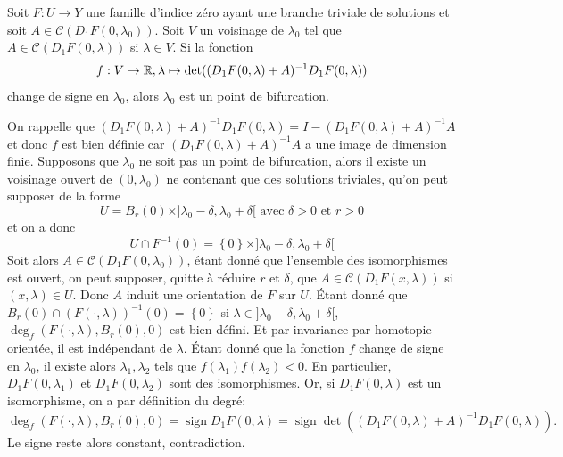 \documentclass[memoire.tex]{subfiles}
\begin{document}
\begin{theobox}{}{}
    Soit $F:U\rightarrow Y$ une famille d'indice zéro ayant une branche triviale de solutions et soit $A\in\mathcal{C}(D_1F(0,\lambda_0)) $. Soit $V$ un voisinage de $\lambda_0$ tel que  $A\in \mathcal{C}(D_1F(0,\lambda))$ si $\lambda\in V$. Si la fonction 
    \begin{equation*}
        f: V\rightarrow\mathbb{R}, \lambda\mapsto \det ((D_1F(0,\lambda)+A)^{-1}D_1F(0,\lambda))
    \end{equation*}change de signe en $\lambda_0$, alors $\lambda_0$ est un point de bifurcation. 
\end{theobox}
\begin{preuve}
    On rappelle que 
    $(D_1F(0,\lambda)+A)^{-1}D_1F(0,\lambda)= I-(D_1F(0,\lambda)+A)^{-1}A$ et donc $f$ est bien définie car $(D_1F(0,\lambda)+A)^{-1}A$ a une image de dimension finie.
    Supposons que $\lambda_0$ ne soit pas un point de 
    bifurcation, alors il existe un voisinage ouvert de $(0,
    \lambda_0)$ ne contenant que des solutions 
    triviales, qu'on peut supposer de la forme 
    \begin{equation*}
        U= B_{r}(0)\times]\lambda_0-\delta,\lambda_0+\delta[\text{ avec $\delta>0$ et $r>0$}
    \end{equation*}
    et on a donc 
    \begin{equation*}
        U\cap F^{-1}(0)=\left\{0\right\}\times ]\lambda_0-\delta,\lambda_0+\delta[
    \end{equation*}
    Soit alors $A\in\mathcal{C}(D_1F(0,\lambda_0))$, étant donné que l'ensemble des isomorphismes est ouvert, on peut supposer, quitte à réduire $r$ et $\delta$, que $A\in\mathcal{C}(D_1F(x,\lambda))$ si $(x,\lambda)\in U$. Donc $A$ induit une orientation de $F$ sur $U$. Étant donné que $B_r(0)\cap (F(\cdot,\lambda))^{-1}(0)=\left\{0\right\}$ si $\lambda\in ]\lambda_0-\delta,\lambda_0+\delta[$, $\deg_f(F(\cdot,\lambda),B_r(0),0)$ est bien défini. Et par invariance par homotopie orientée, il est indépendant de $\lambda$.
    Étant donné que la fonction $f$ change de signe en $\lambda_0$, il existe alors $\lambda_1,\lambda_2$ tels que $f(\lambda_1)f(\lambda_2)<0$. En particulier, $D_1F(0,\lambda_1)$ et $D_1F(0,\lambda_2)$ sont des isomorphismes. Or, si $D_1F(0,\lambda)$ est un isomorphisme, on a par définition du degré: 
    \begin{equation*}
        \deg_f (F(\cdot,\lambda),B_r(0),0)=\operatorname*{sign}D_1F(0,\lambda)=\operatorname*{sign} \det ((D_1F(0,\lambda)+A)^{-1}D_1F(0,\lambda)).
    \end{equation*}
    Le signe reste alors constant, contradiction.
\end{preuve}
\end{document}
